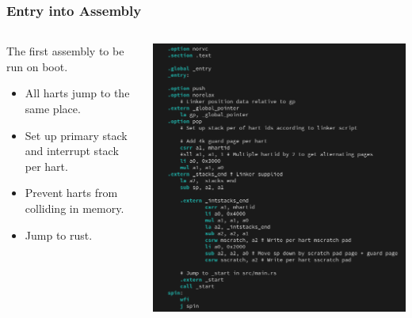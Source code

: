 \documentclass{beamer}
\begin{document}
\begin{frame}
  \frametitle{Entry into Assembly}
  \begin{columns}
    \begin{column}{0.5\textwidth}
      The first assembly to be run on boot.
      \begin{itemize}
      \item All harts jump to the same place.\\
      \item Set up primary stack and interrupt stack per hart.\\
      \item Prevent harts from colliding in memory.\\
      \item Jump to rust.
      \end{itemize}
    \end{column}
    \begin{column}{0.5\textwidth}
      \includegraphics[width=\textwidth]{entry.png}
    \end{column}
  \end{columns}
\end{frame}
\end{document}
